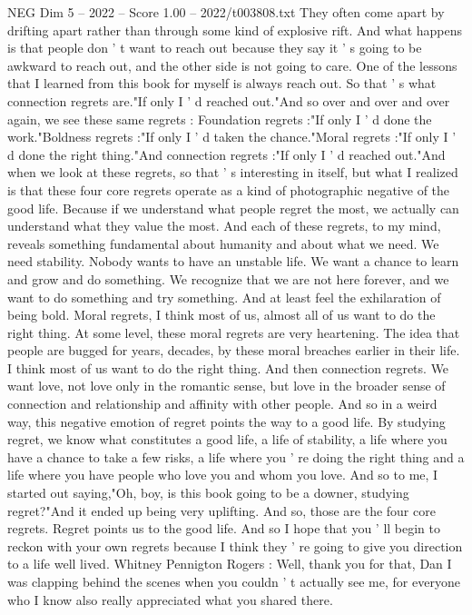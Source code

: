 \begin{textsample}{NEG Dim 5 – 2022 – Score 1.00 – 2022/t003808.txt}
They often come apart by drifting apart rather than through some kind of explosive rift.
And what happens is that people don ' t want to reach out because they say it ' s going to be awkward to reach out, and the other side is not going to care.
One of the lessons that I learned from this book for myself is always reach out.
So that ' s what connection regrets are."If only I ' d reached out."And so over and over and over again, we see these same regrets : Foundation regrets :"If only I ' d done the work."Boldness regrets :"If only I ' d taken the chance."Moral regrets :"If only I ' d done the right thing."And connection regrets :"If only I ' d reached out."And when we look at these regrets, so that ' s interesting in itself, but what I realized is that these four core regrets operate as a kind of photographic negative of the good life.
Because if we understand what people regret the most, we actually can understand what they value the most.
And each of these regrets, to my mind, reveals something fundamental about humanity and about what we need.
We need stability.
Nobody wants to have an unstable life.
We want a chance to learn and grow and do something.
We recognize that we are not here forever, and we want to do something and try something.
And at least feel the exhilaration of being bold.
Moral regrets, I think most of us, almost all of us want to do the right thing.
At some level, these moral regrets are very heartening.
The idea that people are bugged for years, decades, by these moral breaches earlier in their life.
I think most of us want to do the right thing.
And then connection regrets.
We want love, not love only in the romantic sense, but love in the broader sense of connection and relationship and affinity with other people.
And so in a weird way, this negative emotion of regret points the way to a good life.
By studying regret, we know what constitutes a good life, a life of stability, a life where you have a chance to take a few risks, a life where you ' re doing the right thing and a life where you have people who love you and whom you love.
And so to me, I started out saying,"Oh, boy, is this book going to be a downer, studying regret?"And it ended up being very uplifting.
And so, those are the four core regrets.
Regret points us to the good life.
And so I hope that you ' ll begin to reckon with your own regrets because I think they ' re going to give you direction to a life well lived.
Whitney Pennigton Rogers : Well, thank you for that, Dan I was clapping behind the scenes when you couldn ' t actually see me, for everyone who I know also really appreciated what you shared there.

\end{textsample}
